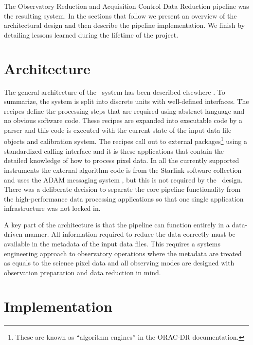 \documentclass[final,authoryear,5p,times,twocolumn]{elsarticle}
\begin{document}
The Observatory Reduction and Acquisition Control Data Reduction pipeline
\citep[\oracdr;][]{1999ASPC..172...11E,2008AN....329..295C} was
the resulting system. In the sections that follow we present an
overview of the architectural design and then describe the pipeline
implementation. We finish by detailing lessons learned during the
lifetime of the project.

\section{Architecture}

The general architecture of the \oracdr\ system has been described
elsewhere \citep{1999ASPC..172...11E,2008AN....329..295C}. To
summarize, the system is split into discrete units with well-defined
interfaces. The recipes define the processing steps that are required
using abstract language and no obvious software code. These recipes
are expanded into executable code by a parser and this code is
executed with the current state of the input data file objects and
calibration system. The recipes call out to external
packages\footnote{These are known as ``algorithm engines'' in the
 ORAC-DR documentation.} using a standardized calling interface and it is these
applications that contain the detailed knowledge of how to process pixel
data. In all the currently supported instruments the external algorithm
code is from the Starlink software collection
\citep[][]{2014ASPC..485..391C} and uses the ADAM
messaging system \citep{1992ASPC...25..126A}, but this is not
required by the \oracdr\ design. There was a deliberate decision to
separate the core pipeline functionality from the high-performance
data processing applications so that one single application
infrastructure was not locked in.

A key part of the architecture is that the pipeline can function
entirely in a data-driven manner. All information required to reduce
the data correctly must be available in the metadata of the input data
files. This requires a systems engineering approach to observatory
operations where the metadata are treated as equals to the science
pixel data \citep[see e.g.,][for an overview of the JCMT and UKIRT
approach]{2011tfa..confE..42J} and all observing modes are designed
with observation preparation and data reduction in mind.

\section{Implementation}
\end{document}
